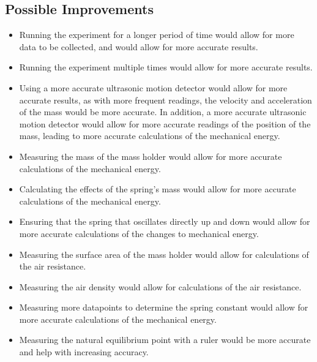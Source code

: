 \documentclass[titlepage]{article}
\begin{document}
        \subsection{Possible Improvements}\label{subsec:possible-improvements}
            \begin{itemize}
                \item Running the experiment for a longer period of time would allow for more data to be collected, and would allow for more accurate results.
                \item Running the experiment multiple times would allow for more accurate results.
                \item Using a more accurate ultrasonic motion detector would allow for more accurate results, as with more frequent readings, the velocity and acceleration of the mass would be more accurate.
                In addition, a more accurate ultrasonic motion detector would allow for more accurate readings of the position of the mass, leading to more accurate calculations of the mechanical energy.
                \item Measuring the mass of the mass holder would allow for more accurate calculations of the mechanical energy.
                \item Calculating the effects of the spring's mass would allow for more accurate calculations of the mechanical energy.
                \item Ensuring that the spring that oscillates directly up and down would allow for more accurate calculations of the changes to mechanical energy.
                \item Measuring the surface area of the mass holder would allow for calculations of the air resistance.
                \item Measuring the air density would allow for calculations of the air resistance.
                \item Measuring more datapoints to determine the spring constant would allow for more accurate calculations of the mechanical energy.
                \item Measuring the natural equilibrium point with a ruler would be more accurate and help with increasing accuracy.
            \end{itemize}
    
    
\end{document}
